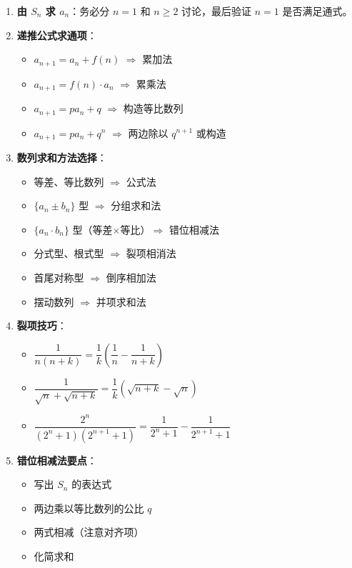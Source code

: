 \documentclass[11pt]{ctexrep}
\begin{document}
\begin{enumerate}
    \item \textbf{由 $S_n$ 求 $a_n$}：务必分 $n = 1$ 和 $n \geq 2$ 讨论，最后验证 $n = 1$ 是否满足通式。
    
    \item \textbf{递推公式求通项}：
    \begin{itemize}
        \item $a_{n+1} = a_n + f(n)$ $\Rightarrow$ 累加法
        \item $a_{n+1} = f(n) \cdot a_n$ $\Rightarrow$ 累乘法
        \item $a_{n+1} = pa_n + q$ $\Rightarrow$ 构造等比数列
        \item $a_{n+1} = pa_n + q^n$ $\Rightarrow$ 两边除以 $q^{n+1}$ 或构造
    \end{itemize}
    
    \item \textbf{数列求和方法选择}：
    \begin{itemize}
        \item 等差、等比数列 $\Rightarrow$ 公式法
        \item $\{a_n \pm b_n\}$ 型 $\Rightarrow$ 分组求和法
        \item $\{a_n \cdot b_n\}$ 型（等差$\times$等比）$\Rightarrow$ 错位相减法
        \item 分式型、根式型 $\Rightarrow$ 裂项相消法
        \item 首尾对称型 $\Rightarrow$ 倒序相加法
        \item 摆动数列 $\Rightarrow$ 并项求和法
    \end{itemize}
    
    \item \textbf{裂项技巧}：
    \begin{itemize}
        \item $\dfrac{1}{n(n+k)} = \dfrac{1}{k}\left(\dfrac{1}{n} - \dfrac{1}{n+k}\right)$
        \item $\dfrac{1}{\sqrt{n} + \sqrt{n+k}} = \dfrac{1}{k}(\sqrt{n+k} - \sqrt{n})$
        \item $\dfrac{2^n}{(2^n+1)(2^{n+1}+1)} = \dfrac{1}{2^n+1} - \dfrac{1}{2^{n+1}+1}$
    \end{itemize}
    
    \item \textbf{错位相减法要点}：
    \begin{itemize}
        \item 写出 $S_n$ 的表达式
        \item 两边乘以等比数列的公比 $q$
        \item 两式相减（注意对齐项）
        \item 化简求和
    \end{itemize}
\end{enumerate}
\end{document}
